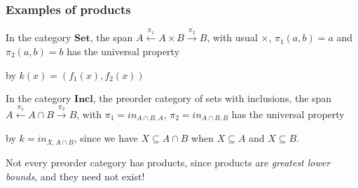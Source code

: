 \documentclass[handout]{beamer}
\newcommand{\bfsf}[1]{{\boldsymbol{#1}}}
\newcommand{\Set}{\bfsf{Set}}
\newcommand{\Incl}{\bfsf{Incl}}
\begin{document}
\frame
  {   
    \frametitle{Examples of products}\label{Ch4:ProdExa}

In the category $\Set$, the span 
$A \stackrel{\pi_1}{\leftarrow} A\times B \stackrel{\pi_2}{\to}  B$,
with usual $\times$, $\pi_1(a,b) = a$ and $\pi_2(a,b) = b$ has the universal property
by $k(x) =(f_1(x),f_2(x))$\\\vspace*{0.2cm}

In the category $\Incl$, the preorder category of sets with inclusions,
the span 
$A \stackrel{\pi_1}{\leftarrow} A\cap B \stackrel{\pi_2}{\to}  B$,
with $\pi_1= in_{A\cap B,A}$, $\pi_2= in_{A\cap B,B}$ has the universal property
by $k =  in_{X,A\cap B}$, since we have $X \subseteq A\cap B$ when
$X\subseteq A$ and $X\subseteq B$.

Not every preorder category  has products, since products are 
\emph{greatest lower bounds}, and they need not exist!
 }
\end{document}
